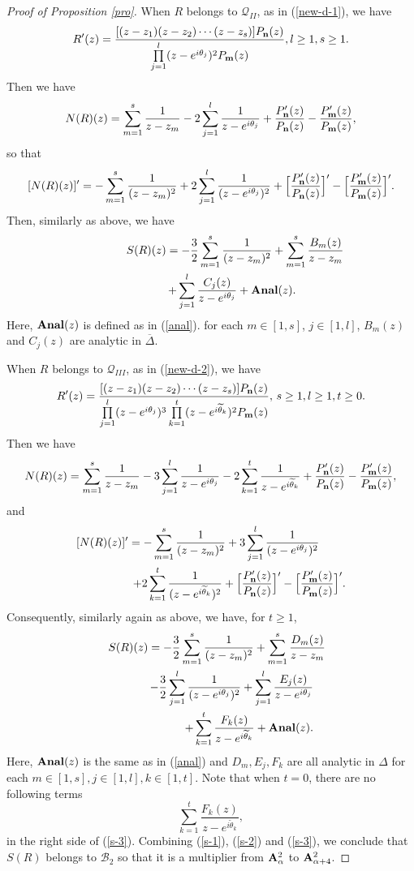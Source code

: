 \documentclass[10pt]{amsart}
\theoremstyle{definition}    %
\numberwithin{equation}{section}
\begin{document}
\begin{proof}[Proof of Proposition \ref{pro}]
When $R$ belongs to $\mathcal{Q}_{II}$, as in (\ref{new-d-1}), we have 
$$R'(z)=\frac{[(z-z_1)(z-z_2)\cdots(z-z_s)]P_{\bf n}(z)}{\prod\limits_{j=1}^{l}(z-e^{i\theta_j})^2 P_{{\bf m}}(z)}, l\geq 1, s\geq 1.$$
Then we have
$$N(R)(z)=\sum_{m=1}^{s}\frac{1}{z-z_m}-2\sum_{j=1}^{l} \frac{1}{z-e^{i\theta_j}}+\frac{P'_{\bf n}(z)}{P_{\bf n}(z)}-\frac{P'_{\bf m}(z)}{P_{\bf m}(z)},$$
so that 
$$[N(R)(z)]'=-\sum_{m=1}^{s}\frac{1}{(z-z_m)^2}+2\sum_{j=1}^{l} \frac{1}{(z-e^{i\theta_j})^2}+\Big[\frac{P'_{\bf n}(z)}{P_{\bf n}(z)}\Big]'-\Big[\frac{P'_{\bf m}(z)}{P_{\bf m}(z)}\Big]'.$$
Then, similarly as above, we have
\begin{eqnarray}\label{s-2}
\lefteqn{S(R)(z)=-\frac{3}{2}\sum_{m=1}^{s}\frac{1}{(z-z_m)^2}+ \sum_{m=1}^{s}\frac{B_m(z)}{z-z_m}}
\\
&&\quad\quad\,\,\,\,+\sum_{j=1}^{l} \frac{C_j(z)}{z-e^{i\theta_j}}+{\bf Anal}(z).\nonumber 
\end{eqnarray}
Here, ${\bf Anal}(z)$ is defined as in (\ref{anal}). for each $m\in [1, s]$, $j\in [1, l]$, $B_m(z)$ and $C_j(z)$ are analytic in $\overline{\Delta}$. 

When $R$ belongs to $\mathcal{Q}_{III}$, as in (\ref{new-d-2}), we have 
$$R'(z)=\frac{[(z-z_1)(z-z_2)\cdots(z-z_s)]P_{\bf n}(z)}{\prod\limits_{j=1}^{l}(z-e^{i\theta_j})^3\prod\limits_{k=1}^{t}(z-e^{i\widetilde{\theta}_k})^2P_{\bf m}(z)},\, s\geq 1, l\geq 1, t\geq 0.$$
Then we have 
$$N(R)(z)=\sum_{m=1}^{s}\frac{1}{z-z_m}-3\sum_{j=1}^{l} \frac{1}{z-e^{i\theta_j}}-2\sum_{k=1}^{t}\frac{1}{z-e^{i\widetilde{\theta}_k}}+\frac{P'_{\bf n}(z)}{P_{\bf n}(z)}-\frac{P'_{\bf m}(z)}{P_{\bf m}(z)},$$
and 
\begin{eqnarray}\lefteqn{[N(R)(z)]'=-\sum_{m=1}^{s}\frac{1}{(z-z_m)^2}+3\sum_{j=1}^{l} \frac{1}{(z-e^{i\theta_j})^2}}\nonumber
\\
&&\quad\quad\quad\quad+2\sum_{k=1}^{t} \frac{1}{(z-e^{i\widetilde{\theta}_k})^2}+\Big[\frac{P'_{\bf n}(z)}{P_{\bf n}(z)}\Big]'-\Big[\frac{P'_{\bf m}(z)}{P_{\bf m}(z)}\Big]'.\nonumber\end{eqnarray}
Consequently, similarly again as above, we have, for $t\geq 1$,
\begin{eqnarray}\label{s-3}
\lefteqn{S(R)(z)=-\frac{3}{2}\sum_{m=1}^{s}\frac{1}{(z-z_m)^2}+ \sum_{m=1}^{s}\frac{D_m(z)}{z-z_m}} 
\\
&&\quad\quad\,\,\,\,-\frac{3}{2}\sum_{j=1}^{l}\frac{1}{(z-e^{i\theta_j})^2}+\sum_{j=1}^{l} \frac{E_j(z)}{z-e^{i\theta_j}}\nonumber \\
&&\quad\quad\,\,\,\, +\sum_{k=1}^{t} \frac{F_k(z)}{z-e^{i\widetilde{\theta}_k}}+{\bf Anal}(z).\nonumber
\end{eqnarray}
Here,  ${\bf Anal}(z)$ is the same as in (\ref{anal}) and $D_m, E_j, F_k$ are all analytic in $\Delta$ for each $m\in [1, s], j\in [1,l], k\in [1, t]$. Note that when $t=0$, there are no following terms
$$\sum_{k=1}^{t} \frac{F_k(z)}{z-e^{i\widetilde{\theta}_k}},$$
in the right side of (\ref{s-3}). 
Combining (\ref{s-1}), (\ref{s-2}) and (\ref{s-3}), we conclude that $S(R)$ belongs to $\mathcal{B}_2$ so that it is a multiplier from ${\bf A}_{\alpha}^2$ to ${\bf A}_{\alpha+4}^2$.  


\end{proof}
\end{document}
